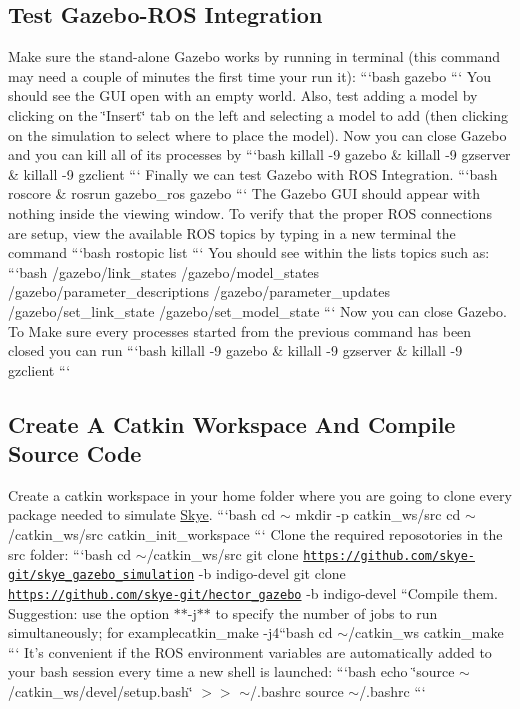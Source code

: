 {\ttfamily \subsection*{Test Gazebo-\/\-R\-O\-S Integration}}

{\ttfamily  Make sure the stand-\/alone Gazebo works by running in terminal (this command may need a couple of minutes the first time your run it)\-: ```bash gazebo ``` You should see the G\-U\-I open with an empty world. Also, test adding a model by clicking on the \char`\"{}\-Insert\char`\"{} tab on the left and selecting a model to add (then clicking on the simulation to select where to place the model). Now you can close Gazebo and you can kill all of its processes by ```bash killall -\/9 gazebo \& killall -\/9 gzserver \& killall -\/9 gzclient ``` Finally we can test Gazebo with R\-O\-S Integration. ```bash roscore \& rosrun gazebo\-\_\-ros gazebo ``` The Gazebo G\-U\-I should appear with nothing inside the viewing window. To verify that the proper R\-O\-S connections are setup, view the available R\-O\-S topics by typing in a new terminal the command ```bash rostopic list ``` You should see within the lists topics such as\-: ```bash /gazebo/link\-\_\-states /gazebo/model\-\_\-states /gazebo/parameter\-\_\-descriptions /gazebo/parameter\-\_\-updates /gazebo/set\-\_\-link\-\_\-state /gazebo/set\-\_\-model\-\_\-state ``` Now you can close Gazebo. To Make sure every processes started from the previous command has been closed you can run ```bash killall -\/9 gazebo \& killall -\/9 gzserver \& killall -\/9 gzclient ```}

{\ttfamily \subsection*{Create A Catkin Workspace And Compile Source Code}}

{\ttfamily  Create a catkin workspace in your home folder where you are going to clone every package needed to simulate \hyperlink{class_skye}{Skye}. ```bash cd $\sim$ mkdir -\/p catkin\-\_\-ws/src cd $\sim$/catkin\-\_\-ws/src catkin\-\_\-init\-\_\-workspace ``` Clone the required reposotories in the src folder\-: ```bash cd $\sim$/catkin\-\_\-ws/src git clone \href{https://github.com/skye-git/skye_gazebo_simulation}{\tt https\-://github.\-com/skye-\/git/skye\-\_\-gazebo\-\_\-simulation} -\/b indigo-\/devel git clone \href{https://github.com/skye-git/hector_gazebo}{\tt https\-://github.\-com/skye-\/git/hector\-\_\-gazebo} -\/b indigo-\/devel ``{\ttfamily  Compile them. Suggestion\-: use the option $\ast$$\ast$-\/j$\ast$$\ast$ to specify the number of jobs to run simultaneously; for example}catkin\-\_\-make -\/j4{\ttfamily  }``bash cd $\sim$/catkin\-\_\-ws catkin\-\_\-make ``` It's convenient if the R\-O\-S environment variables are automatically added to your bash session every time a new shell is launched\-: ```bash echo \char`\"{}source $\sim$/catkin\-\_\-ws/devel/setup.\-bash\char`\"{} $>$$>$ $\sim$/.bashrc source $\sim$/.bashrc ```}

